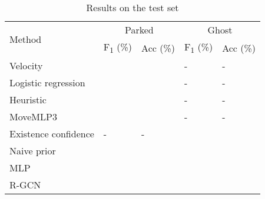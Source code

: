 \documentclass[letterpaper, 10 pt, journal, twoside]{IEEEtran}
\begin{document}
\begin{table}[!t]
	\scriptsize
	\caption{Results on the test set}
	\vspace{-0.1cm}
	\label{tab:results_test}
	\setlength{\tabcolsep}{1pt}
	\centering
	\begin{tabularx}{\columnwidth}{Xllll}
		\toprule
		\multirow{2}{*}{Method}                      &                              \multicolumn{2}{c}{Parked}                               &                               \multicolumn{2}{c}{Ghost}                               \\
		\cmidrule(lr){2-3}\cmidrule(lr){4-5}         & F\textsubscript{1} (\%)                   & Acc (\%)                                  & F\textsubscript{1} (\%)                   & Acc (\%)                                  \\ \midrule
		Velocity                                     &                                    &                                    & -                                         & -                                         \\
		Logistic regression                          &                                    &                                    & -                                         & -                                         \\
		Heuristic \cite{Behrendt2019}                &                                    &                                    & -                                         & -                                         \\
		MoveMLP3 \cite{Behrendt2019}                 &           &           & -                                         & -                                         \\ \midrule
		Existence confidence \cite{Aeberhard2011}    & -                                         & -                                         &                                    &                                    \\ \midrule
		Naive prior                                  &                                     &                                    &                                    &                                    \\
		MLP                                          &           &           &           &           \\
		R-GCN \cite{Schlichtkrull2018}               &           &           &           &           \\

\end{tabularx}
\end{table}
\end{document}
